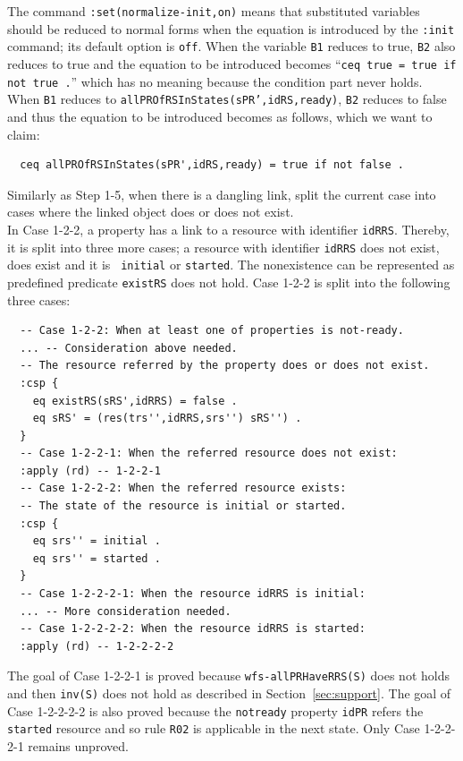 \documentclass[12pt]{report}
\newcommand{\stt}[1]{{\small{\tt {#1}}}}
\begin{document}
The command \stt{:set(normalize-init,on)} means that substituted
variables should be reduced to normal forms when the equation is
introduced by the {\tt :init} command; its default option is {\tt off}.
When the variable {\tt B1} reduces to true, {\tt B2} also reduces to
true and the equation to be introduced becomes ``\stt{ceq true = true if
  not true .}''  which has no meaning because the condition part never
holds.  When {\tt B1} reduces to
\stt{allPROfRSInStates(sPR',idRS,ready)}, {\tt B2} reduces to false
and thus the equation to be introduced becomes as follows, which we
want to claim:
\small
\begin{verbatim}
  ceq allPROfRSInStates(sPR',idRS,ready) = true if not false .
\end{verbatim}
\normalsize

 Similarly as Step 1-5, when there is a
dangling link, split the current case into cases where the linked
object does or does not exist. \\
In Case 1-2-2, a property has a link to a resource with identifier
{\tt idRRS}. Thereby, it is split into three more cases; a resource
with identifier {\tt idRRS} does not exist, does exist and it is {\tt
  initial} or {\tt started}. The nonexistence can be represented as
predefined predicate {\tt existRS} does not hold. Case 1-2-2 is split
into the following three cases:
\small
\begin{verbatim}
  -- Case 1-2-2: When at least one of properties is not-ready.
  ... -- Consideration above needed.
  -- The resource referred by the property does or does not exist.
  :csp {
    eq existRS(sRS',idRRS) = false .
    eq sRS' = (res(trs'',idRRS,srs'') sRS'') .
  }
  -- Case 1-2-2-1: When the referred resource does not exist:
  :apply (rd) -- 1-2-2-1
  -- Case 1-2-2-2: When the referred resource exists:
  -- The state of the resource is initial or started.
  :csp { 
    eq srs'' = initial .
    eq srs'' = started .
  }
  -- Case 1-2-2-2-1: When the resource idRRS is initial:
  ... -- More consideration needed.
  -- Case 1-2-2-2-2: When the resource idRRS is started:
  :apply (rd) -- 1-2-2-2-2
\end{verbatim}
\normalsize
The goal of Case 1-2-2-1 is proved because \stt{wfs-allPRHaveRRS(S)}
does not holds and then \stt{inv(S)} does not hold as described in
Section~\ref{sec:support}.  The goal of Case 1-2-2-2-2 is also proved
because the {\tt notready} property {\tt idPR} refers the {\tt
  started} resource and so rule {\tt R02} is applicable in the next state.  Only Case
1-2-2-2-1 remains unproved.\\
\end{document}
